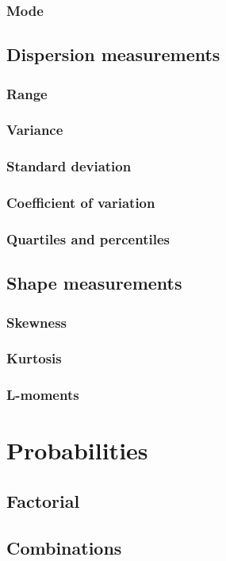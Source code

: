 \documentclass{report}
\begin{document}
		\subsection{Mode}
	\section{Dispersion measurements}
		\subsection{Range}
		\subsection{Variance}
		\subsection{Standard deviation}
		\subsection{Coefficient of variation}
		\subsection{Quartiles and percentiles}
	\section{Shape measurements}
		\subsection{Skewness}
		\subsection{Kurtosis}
		\subsection{L-moments}

\chapter{Probabilities}
	\section{Factorial}
	\section{Combinations}
\end{document}
